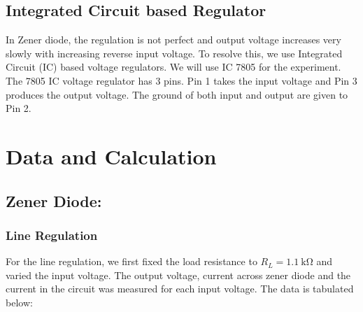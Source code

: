 \documentclass{scrartcl}
\begin{document}
\subsection{Integrated Circuit based Regulator}
In Zener diode, the regulation is not perfect and output
voltage increases very slowly with increasing reverse input voltage. To resolve this, we use Integrated Circuit (IC) based voltage regulators. We will use IC 7805 for the experiment.
The 7805 IC voltage regulator has
3 pins. Pin 1 takes the input voltage and Pin 3 produces the output
voltage. The ground of both input and output are given to Pin 2.


\section{Data and Calculation}
\subsection{Zener Diode:}
\subsubsection{Line Regulation }
For the line regulation, we first fixed the load resistance to $R_L = \SI{1.1}{\kohm}$ and varied the input voltage. The output voltage, current across zener diode and the current in the circuit was measured for each input voltage. The data is tabulated below:
\end{document}
